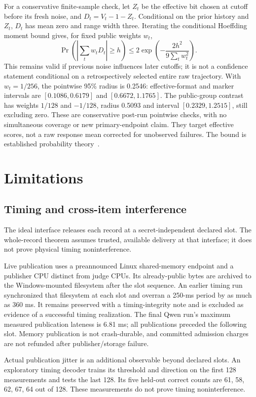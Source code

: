 \documentclass[10pt,twocolumn]{article}
\begin{document}
For a conservative finite-sample check, let $Z_t$ be the effective bit chosen at cutoff before its fresh noise, and $D_t=V_t-1-Z_t$. Conditional on the prior history and $Z_t$, $D_t$ has mean zero and range width three. Iterating the conditional Hoeffding moment bound gives, for fixed public weights $w_t$,
\[
\Pr\!\left(\left|\sum_tw_tD_t\right|\geq h\right)
\leq2\exp\!\left(-\frac{2h^2}{9\sum_tw_t^2}\right).
\]
This remains valid if previous noise influences later cutoffs; it is not a confidence statement conditional on a retrospectively selected entire raw trajectory. With $w_t=1/256$, the pointwise 95\% radius is 0.2546: effective-format and marker intervals are $[0.1086,0.6179]$ and $[0.6672,1.1765]$. The public-group contrast has weights $1/128$ and $-1/128$, radius 0.5093 and interval $[0.2329,1.2515]$, still excluding zero. These are conservative post-run pointwise checks, with no simultaneous coverage or new primary-endpoint claim. They target effective scores, not a raw response mean corrected for unobserved failures. The bound is established probability theory~\cite{guntuboyina}.

\section{Limitations}
\subsection{Timing and cross-item interference}\label{sec:timing-limitations}
The ideal interface releases each record at a secret-independent declared slot. The whole-record theorem assumes trusted, available delivery at that interface; it does not prove physical timing noninterference.

Live publication uses a preannounced Linux shared-memory endpoint and a publisher CPU distinct from judge CPUs. Its already-public bytes are archived to the Windows-mounted filesystem after the slot sequence. An earlier timing run synchronized that filesystem at each slot and overran a 250-ms period by as much as 360 ms. It remains preserved with a timing-integrity note and is excluded as evidence of a successful timing realization. The final Qwen run's maximum measured publication lateness is 6.81 ms; all publications preceded the following slot. Memory publication is not crash-durable, and committed admission charges are not refunded after publisher/storage failure.

Actual publication jitter is an additional observable beyond declared slots. An exploratory timing decoder trains its threshold and direction on the first 128 measurements and tests the last 128. Its five held-out correct counts are 61, 58, 62, 67, 64 out of 128. These measurements do not prove timing noninterference.
\end{document}
